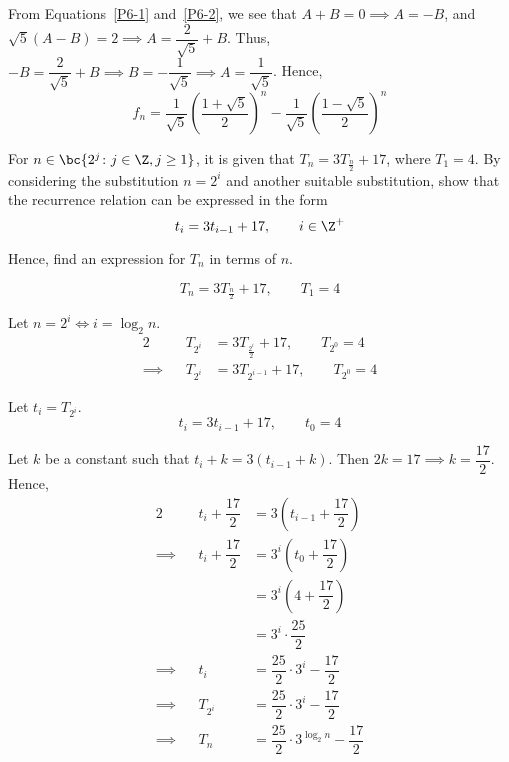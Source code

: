 \documentclass{echw}
\begin{document}
            From Equations~\ref{P6-1} and~\ref{P6-2}, we see that $A + B = 0 \implies A = -B$, and $\sqrt5 (A - B) = 2 \implies A = \dfrac2{\sqrt5} + B$. Thus, $-B = \dfrac2{\sqrt5} + B \implies B = -\dfrac1{\sqrt5} \implies A = \dfrac1{\sqrt5}$. Hence,
            \[
                f_n = \dfrac1{\sqrt5} \left(\dfrac{1 + \sqrt5}{2}\right)^n - \dfrac1{\sqrt5} \left(\dfrac{1 - \sqrt5}{2}\right)^n
            \]


    \problem{}
        For $n \in \bc{2^j \colon j \in \Z, j \geq 1}$, it is given that $T_n = 3T_{\tfrac{n}2} + 17$, where $T_1 = 4$. By considering the substitution $n = 2^i$ and another suitable substitution, show that the recurrence relation can be expressed in the form
        \[
            t_i = 3t_{i-1} + 17, \qquad i \in \Z^+
        \]
        
        Hence, find an expression for $T_n$ in terms of $n$.

    \solution
        \[
            T_n = 3T_{\tfrac{n}2} + 17, \qquad T_1 = 4
        \]

        Let $n = 2^i \iff i = \log_2{n}$.
        \begin{alignat*}{2}
            &&T_{2^i} &= 3T_{\tfrac{2^i}2} + 17, \qquad T_{2^0} = 4\\
            \implies&&T_{2^i} &= 3T_{2^{i-1}} + 17, \qquad T_{2^0} = 4
        \end{alignat*}

        Let $t_i = T_{2^i}$.
        \[
            t_i = 3t_{i-1} + 17, \qquad t_0 = 4
        \]

        Let $k$ be a constant such that $t_i + k = 3(t_{i-1} + k)$. Then $2k = 17 \implies k = \dfrac{17}2$. Hence,
        \begin{alignat*}{2}
            &&t_i + \dfrac{17}2 &= 3\left(t_{i-1} + \dfrac{17}2\right)\\
            \implies&&t_i + \dfrac{17}2 &= 3^i \left(t_0 + \dfrac{17}2\right)\\
            && &= 3^i \left(4 + \dfrac{17}2\right)\\
            && &= 3^i \cdot \dfrac{25}2\\
            \implies&&t_i &= \dfrac{25}2 \cdot 3^i - \dfrac{17}2\\
            \implies&&T_{2^i} &= \dfrac{25}2 \cdot 3^i - \dfrac{17}2\\
            \implies&&T_n &= \dfrac{25}2 \cdot 3^{\log_2{n}} - \dfrac{17}2
        \end{alignat*}
\end{document}
